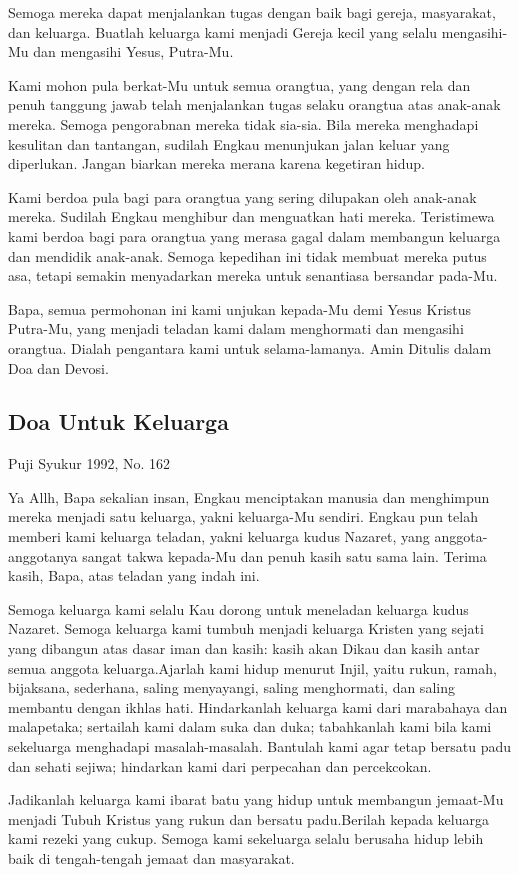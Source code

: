 \documentclass[titlepage,11pt,openany]{scrbook}
\newcommand{\ps}[2][\numexpr\value{subsection}+1\relax]{%
\setcounter{subsection}{\numexpr#1-1\relax}
\subsection{#2}
}
\begin{document}
Semoga mereka dapat menjalankan tugas dengan baik bagi gereja, masyarakat, dan keluarga. Buatlah keluarga kami menjadi Gereja kecil yang selalu mengasihi-Mu dan mengasihi Yesus, Putra-Mu.

Kami mohon pula berkat-Mu untuk semua orangtua, yang dengan rela dan penuh tanggung jawab telah menjalankan tugas selaku orangtua atas anak-anak mereka. Semoga pengorabnan mereka tidak sia-sia. Bila mereka menghadapi kesulitan dan tantangan, sudilah Engkau menunjukan jalan keluar yang diperlukan. Jangan biarkan mereka merana karena kegetiran hidup.

Kami berdoa pula bagi para orangtua yang sering dilupakan oleh anak-anak mereka. Sudilah Engkau menghibur dan menguatkan hati mereka. Teristimewa kami berdoa bagi para orangtua yang merasa gagal dalam membangun keluarga dan mendidik anak-anak. Semoga kepedihan ini tidak membuat mereka putus asa, tetapi semakin menyadarkan mereka untuk senantiasa bersandar pada-Mu.

Bapa, semua permohonan ini kami unjukan kepada-Mu demi Yesus Kristus Putra-Mu, yang menjadi teladan kami dalam menghormati dan mengasihi orangtua. Dialah pengantara kami untuk selama-lamanya. Amin
Ditulis dalam Doa dan Devosi. 

\ps{Doa Untuk Keluarga}
Puji Syukur 1992, No. 162

Ya Allh, Bapa sekalian insan, Engkau menciptakan manusia dan menghimpun mereka menjadi satu keluarga, yakni keluarga-Mu sendiri. Engkau pun telah memberi kami keluarga teladan, yakni keluarga kudus Nazaret, yang anggota-anggotanya sangat takwa kepada-Mu dan penuh kasih satu sama lain. Terima kasih, Bapa, atas teladan yang indah ini.

Semoga keluarga kami selalu Kau dorong untuk meneladan keluarga kudus Nazaret. Semoga keluarga kami tumbuh menjadi keluarga Kristen yang sejati yang dibangun atas dasar iman dan kasih: kasih akan Dikau dan kasih antar semua anggota keluarga.Ajarlah kami hidup menurut Injil, yaitu rukun, ramah, bijaksana, sederhana, saling menyayangi, saling menghormati, dan saling membantu dengan ikhlas hati. Hindarkanlah keluarga kami dari marabahaya dan malapetaka; sertailah kami dalam suka dan duka; tabahkanlah kami bila kami sekeluarga menghadapi masalah-masalah. Bantulah kami agar tetap bersatu padu dan sehati sejiwa; hindarkan kami dari perpecahan dan percekcokan.

Jadikanlah keluarga kami ibarat batu yang hidup untuk membangun jemaat-Mu menjadi Tubuh Kristus yang rukun dan bersatu padu.Berilah kepada keluarga kami rezeki yang cukup. Semoga kami sekeluarga selalu berusaha hidup lebih baik di tengah-tengah jemaat dan masyarakat.
\end{document}
